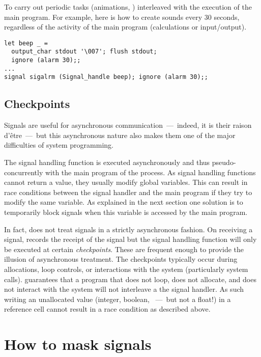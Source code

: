 \begin{example} 
\label{ex/beep}
To carry out periodic tasks (animations, \etc) interleaved with
the execution of the main program.  For example, here is how
to create  sounds every 30 seconds, regardless of
the activity of the main program (calculations or input/output).

\begin{lstlisting}
let beep _ = 
  output_char stdout '\007'; flush stdout; 
  ignore (alarm 30);;
...
signal sigalrm (Signal_handle beep); ignore (alarm 30);;
\end{lstlisting}
\end{example}

\subsection*{Checkpoints}

Signals are useful for asynchronous communication~---~indeed, it is
their raison d'\^etre~---~but this asynchronous nature also makes them
one of the major difficulties of system programming.

The signal handling function is executed asynchronously and thus
pseudo-concurrently with the main program of the process.  As signal
handling functions cannot return a value, they usually modify global
variables. This can result in race conditions between the signal
handler and the main program if they try to modify the same variable.
As explained in the next section one solution is to temporarily block
signals when this variable is accessed by the main program.

In fact, {\ocaml} does not treat signals in a strictly asynchronous
fashion.  On receiving a signal, {\ocaml} records the receipt of the
signal but the signal handling function will only be executed at
certain \emph{checkpoints}.  These are frequent enough to provide the
illusion of asynchronous treatment.  The checkpoints typically occur
during allocations, loop controls, or interactions with the system
(particularly system calls). {\ocaml} guarantees that a program that
does not loop, does not allocate, and does not interact with the
system will not interleave a the signal handler. As such writing an
unallocated value (integer, boolean, \etc{}~---~but not a float!) in a
reference cell cannot result in a race condition as described above.

\section{How to mask signals}


